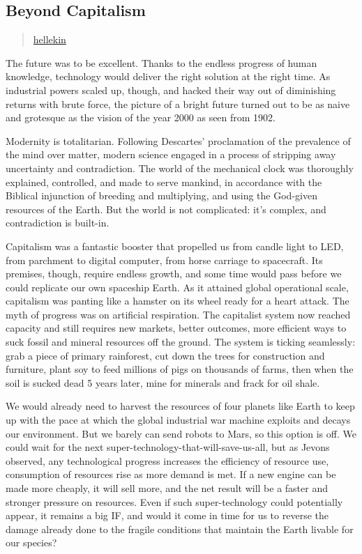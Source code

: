 \subsection{Beyond Capitalism}\label{beyond-capitalism}

\begin{quote}
\href{../appendix/attributions.html\#hellekin}{hellekin}
\end{quote}

The future was to be excellent. Thanks to the endless progress of human
knowledge, technology would deliver the right solution at the right
time. As industrial powers scaled up, though, and hacked their way out
of diminishing returns with brute force, the picture of a bright future
turned out to be as naive and grotesque as the vision of the year 2000
as seen from 1902.

Modernity is totalitarian. Following Descartes' proclamation of the
prevalence of the mind over matter, modern science engaged in a process
of stripping away uncertainty and contradiction. The world of the
mechanical clock was thoroughly explained, controlled, and made to serve
mankind, in accordance with the Biblical injunction of breeding and
multiplying, and using the God-given resources of the Earth. But the
world is not complicated: it's complex, and contradiction is built-in.

Capitalism was a fantastic booster that propelled us from candle light
to LED, from parchment to digital computer, from horse carriage to
spacecraft. Its premises, though, require endless growth, and some time
would pass before we could replicate our own spaceship Earth. As it
attained global operational scale, capitalism was panting like a hamster
on its wheel ready for a heart attack. The myth of progress was on
artificial respiration. The capitalist system now reached capacity and
still requires new markets, better outcomes, more efficient ways to suck
fossil and mineral resources off the ground. The system is ticking
seamlessly: grab a piece of primary rainforest, cut down the trees for
construction and furniture, plant soy to feed millions of pigs on
thousands of farms, then when the soil is sucked dead 5 years later,
mine for minerals and frack for oil shale.

We would already need to harvest the resources of four planets like
Earth to keep up with the pace at which the global industrial war
machine exploits and decays our environment. But we barely can send
robots to Mars, so this option is off. We could wait for the next
super-technology-that-will-save-us-all, but as Jevons observed, any
technological progress increases the efficiency of resource use,
consumption of resources rise as more demand is met. If a new engine can
be made more cheaply, it will sell more, and the net result will be a
faster and stronger pressure on resources. Even if such super-technology
could potentially appear, it remains a big IF, and would it come in time
for us to reverse the damage already done to the fragile conditions that
maintain the Earth livable for our species?

